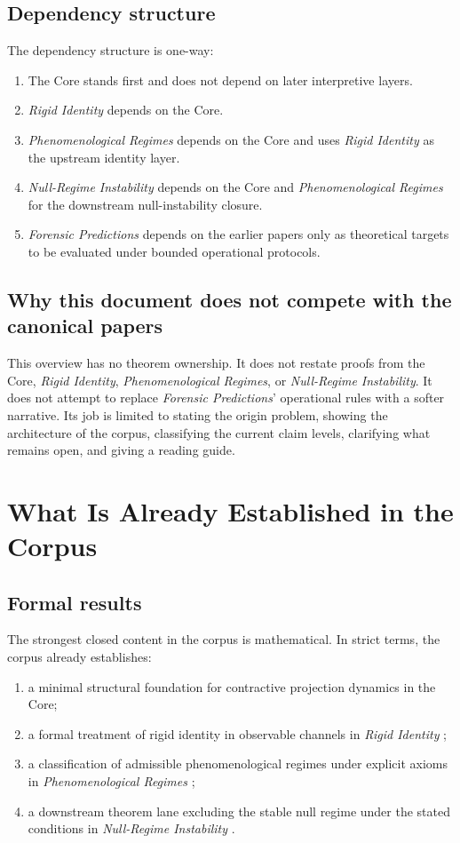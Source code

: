 \documentclass[11pt,a4paper]{article}
\begin{document}
\subsection{Dependency structure}

The dependency structure is one-way:
\begin{enumerate}[leftmargin=*]
\item The Core stands first and does not depend on later interpretive layers.
\item \textit{Rigid Identity} depends on the Core.
\item \textit{Phenomenological Regimes} depends on the Core and uses \textit{Rigid Identity} as the upstream identity layer.
\item \textit{Null-Regime Instability} depends on the Core and \textit{Phenomenological Regimes} for the downstream null-instability closure.
\item \textit{Forensic Predictions} depends on the earlier papers only as theoretical targets to be evaluated under bounded operational protocols.
\end{enumerate}

\subsection{Why this document does not compete with the canonical papers}

This overview has no theorem ownership. It does not restate proofs from the Core, \textit{Rigid Identity}, \textit{Phenomenological Regimes}, or \textit{Null-Regime Instability}. It does not attempt to replace \textit{Forensic Predictions}' operational rules with a softer narrative. Its job is limited to stating the origin problem, showing the architecture of the corpus, classifying the current claim levels, clarifying what remains open, and giving a reading guide.

\section{What Is Already Established in the Corpus}

\subsection{Formal results}

The strongest closed content in the corpus is mathematical. In strict terms, the corpus already establishes:
\begin{enumerate}[leftmargin=*]
\item a minimal structural foundation for contractive projection dynamics in the Core;
\item a formal treatment of rigid identity in observable channels in \textit{Rigid Identity} \cite{paper1};
\item a classification of admissible phenomenological regimes under explicit axioms in \textit{Phenomenological Regimes} \cite{paper2};
\item a downstream theorem lane excluding the stable null regime under the stated conditions in \textit{Null-Regime Instability} \cite{paper3}.
\end{enumerate}
\end{document}
